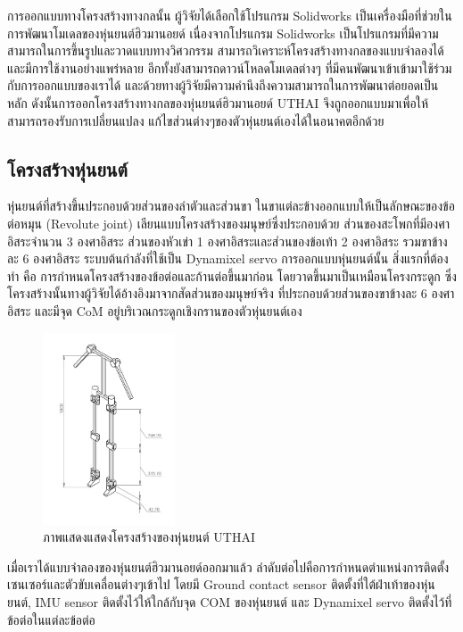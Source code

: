 การออกแบบทางโครงสร้างทางกลนั้น ผู้วิจัยได้เลือกใช้โปรแกรม Solidworks เป็นเครื่องมือที่ช่วยในการพัฒนาโมเดลของหุ่นยนต์ฮิวมานอยด์
เนื่องจากโปรแกรม Solidworks เป็นโปรแกรมที่มีความสามารถในการขึ้นรูปและวาดแบบทางวิศวกรรม
สามารถวิเคราะห์โครงสร้างทางกลของแบบจำลองได้ และมีการใช้งานอย่างแพร่หลาย อีกทั้งยังสามารถดาวน์โหลดโมเดลต่างๆ
ที่มีคนพัฒนาเข้าเข้ามาใช้ร่วมกับการออกแบบของเราได้ และด้วยทางผู้วิจัยมีความคำนึงถึงความสามารถในการพัฒนาต่อยอดเป็นหลัก
ดังนั้นการออกโครงสร้างทางกลของหุ่นยนต์ฮิวมานอยด์ UTHAI จึงถูกออกแบบมาเพื่อให้สามารถรองรับการเปลี่ยนแปลง
แก้ไขส่วนต่างๆของตัวหุ่นยนต์เองได้ในอนาคตอีกด้วย

\clearpage
\subsection{โครงสร้างหุ่นยนต์}
หุ่นยนต์ที่สร้างขึ้นประกอบด้วยส่วนของลำตัวและส่วนขา ในขาแต่ละข้างออกแบบให้เป็นลักษณะของข้อต่อหมุน (Revolute joint)
เลียนแบบโครงสร้างของมนุษย์ซึ่งประกอบด้วย ส่วนของสะโพกที่มีองศาอิสระจำนวน 3 องศาอิสระ ส่วนของหัวเข่า 1
องศาอิสระและส่วนของข้อเท้า 2 องศาอิสระ รวมขาข้างละ 6 องศาอิสระ ระบบต้นกำลังที่ใช้เป็น Dynamixel servo การออกแบบหุ่นยนต์นั้น
สิ่งแรกที่ต้องทำ คือ การกำหนดโครงสร้างของข้อต่อและก้านต่อขึ้นมาก่อน โดยวาดขึ้นมาเป็นเหมือนโครงกระดูก
ซึ่งโครงสร้างนั้นทางผู้วิจัยได้อ้างอิงมาจากสัดส่วนของมนุษย์จริง ที่ประกอบด้วยส่วนของขาข้างละ 6 องศาอิสระ และมีจุด CoM
อยู่บริเวณกระดูกเชิงกรานของตัวหุ่นยนต์เอง
\begin{figure}[!ht]
    \centering
    \includegraphics[width=0.35\textwidth]{chapter3/images/uthai_structure1.png}
    \caption{ภาพแสดงแสดงโครงสร้างของหุ่นยนต์ UTHAI}
    \label{fig:uthai_structure1}
\end{figure}

เมื่อเราได้แบบจำลองของหุ่นยนต์ฮิวมานอยด์ออกมาแล้ว ลำดับต่อไปคือการกำหนดตำแหน่งการติดตั้งเซนเซอร์และตัวขับเคลื่อนต่างๆเข้าไป
โดยมี Ground contact sensor ติดตั้งที่ใต้ฝ่าเท้าของหุ่นยนต์, IMU sensor ติดตั้งไว้ให้ใกล้กับจุด COM ของหุ่นยนต์ และ Dynamixel servo
ติดตั้งไว้ที่ข้อต่อในแต่ละข้อต่อ

